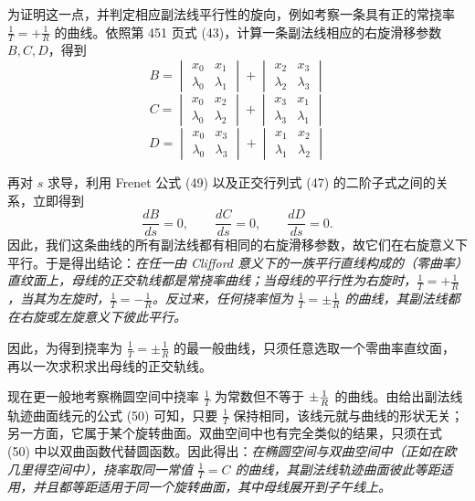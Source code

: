 为证明这一点，并判定相应副法线平行性的旋向，例如考察一条具有正的常挠率 \(\frac1T=+\frac1R\) 的曲线。依照第 451 页式 (43)，计算一条副法线相应的右旋滑移参数 \(B,C,D\)，得到
\[
 B=\begin{vmatrix}x_0&x_1\\ \lambda_0&\lambda_1\end{vmatrix}+\begin{vmatrix}x_2&x_3\\ \lambda_2&\lambda_3\end{vmatrix}
\]
\[
 C=\begin{vmatrix}x_0&x_2\\ \lambda_0&\lambda_2\end{vmatrix}+\begin{vmatrix}x_3&x_1\\ \lambda_3&\lambda_1\end{vmatrix}
\]
\[
 D=\begin{vmatrix}x_0&x_3\\ \lambda_0&\lambda_3\end{vmatrix}+\begin{vmatrix}x_1&x_2\\ \lambda_1&\lambda_2\end{vmatrix}
\]

再对 \(s\) 求导，利用 Frenet 公式 (49) 以及正交行列式 (47) 的二阶子式之间的关系，立即得到
\[
\frac{dB}{ds}=0,\qquad \frac{dC}{ds}=0,\qquad \frac{dD}{ds}=0 .
\]
因此，我们这条曲线的所有副法线都有相同的右旋滑移参数，故它们在右旋意义下平行。于是得出结论：\emph{在任一由 Clifford 意义下的一族平行直线构成的（零曲率）直纹面上，母线的正交轨线都是常挠率曲线；当母线的平行性为右旋时，\(\frac1T=+\frac1R\)，当其为左旋时，\(\frac1T=-\frac1R\)。反过来，任何挠率恒为 \(\frac1T=\pm\frac1R\) 的曲线，其副法线都在右旋或左旋意义下彼此平行。}

因此，为得到挠率为 \(\frac1T=\pm\frac1R\) 的最一般曲线，只须任意选取一个零曲率直纹面，再以一次求积求出母线的正交轨线。

现在更一般地考察椭圆空间中挠率 \(\frac1T\) 为常数但不等于 \(\pm\frac1R\) 的曲线。由给出副法线轨迹曲面线元的公式 (50) 可知，只要 \(\frac1T\) 保持相同，该线元就与曲线的形状无关；另一方面，它属于某个旋转曲面。双曲空间中也有完全类似的结果，只须在式 (50) 中以双曲函数代替圆函数。因此得出：\emph{在椭圆空间与双曲空间中（正如在欧几里得空间中），挠率取同一常值 \(\frac1T=C\) 的曲线，其副法线轨迹曲面彼此等距适用，并且都等距适用于同一个旋转曲面，其中母线展开到子午线上。}

\begin{center}
\end{center}
